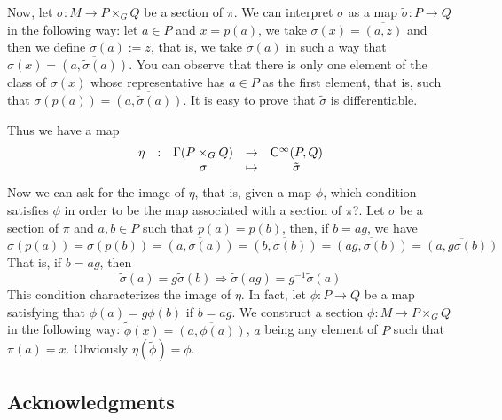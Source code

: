 \documentclass[12pt]{article}
\def\Cinfty{{\rm C}^\infty}
\begin{document}
Now, let $\sigma : M \to P \times_G Q$ be a section of $\pi$. We
can interpret $\sigma$ as a map $\tilde \sigma : P \to Q$ in the
following way: let $a \in P$ and $x=p(a)$, we take $\sigma (x) =
\overline{(a,z)}$ and then we define $\tilde \sigma (a) := z$,
that is, we take $\tilde \sigma (a)$ in such a way that $\sigma
(x) = \overline{(a,\tilde \sigma (a))}$. You can observe that
there is only one element of the class of $\sigma (x)$ whose
representative has $a \in P$ as the first element, that is, such
that $\sigma (p(a)) = \overline{(a,\tilde \sigma (a))}$. It is
easy to prove that $\tilde \sigma$ is differentiable.

Thus we have a map
$$
\begin{array}{ccccc}
\eta & : & \Gamma (P \times_G Q) & \to & \Cinfty(P,Q)
\\
& & \sigma & \mapsto & \tilde \sigma
\end{array}
$$
Now we can ask for the image of $\eta$,
that is, given a map $\phi$,
which condition satisfies $\phi$
in order to be the map associated with a section of $\pi$?.
Let $\sigma$ be a section of $\pi$ and
$a,b \in P$ such that $p(a)=p(b)$,
then,
if $b=ag$,
we have
$$
\sigma(p(a))=
\sigma(p(b)) = \overline{(a,\tilde \sigma(a))} =
\overline{(b,\tilde \sigma(b))} =
\overline{(ag,\tilde \sigma(b))} =
\overline{(a,g \sigma(b))}
$$
That is, if $b=ag$, then
$$
\tilde \sigma(a) = g \tilde \sigma(b)
\Rightarrow
\tilde \sigma(ag) = g^{-1} \tilde \sigma(a)
$$
This condition characterizes the image of $\eta$.
In fact, let $\phi : P \to Q$ be a map satisfying that
$\phi (a) = g \phi (b)$ if $b = ag$. We construct a section
$\tilde \phi : M \to P \times_G Q$ in the following way:
$\tilde \phi (x) = \overline{(a,\phi (a))}$, $a$ being any element of
$P$ such that
$\pi (a) = x$. Obviously $\eta (\tilde \phi ) = \phi$.




\subsection*{Acknowledgments}
\end{document}
